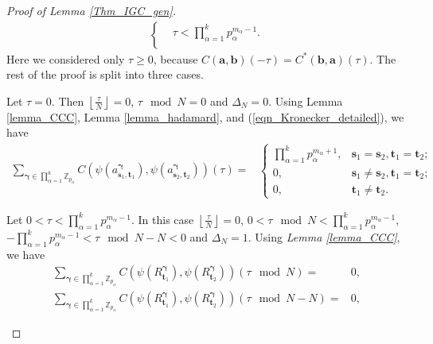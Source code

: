 \documentclass[pdflatex,sn-mathphys-num]{sn-jnl}%
\theoremstyle{thmstyleone}
\newcommand{\floor}[1]{\left\lfloor #1 \right\rfloor}
\begin{document}
\begin{proof}[Proof of Lemma \ref{Thm_IGC_gen}]
\begin{equation}
\begin{split}
\begin{cases}
					& \tau < \prod_{\alpha=1}^{k} p_\alpha^{m_\alpha-1}.\\
				\end{cases}
			\end{split}
		\end{equation}
		Here we considered only $\tau \geq 0$, because $C(\mathbf{a}, \mathbf{b})(-\tau ) = C^*(\mathbf{b}, \mathbf{a})(\tau )$.
		The rest of the proof is split into three cases.
		\begin{mycases}
			\item Let $\tau = 0$. Then $\floor{\frac{\tau}{N}}=0$, $\tau \mod N = 0$ and $\Delta_N=0$. Using Lemma \ref{lemma_CCC}, Lemma \ref{lemma_hadamard}, and (\ref{eqn_Kronecker_detailed}), we have
			\begin{equation}\label{Thm_2_case_1_eqn_1}
				\begin{split}
					\sum_{\bm{\gamma} \in \prod_{\alpha=1}^{k} \mathbb{Z}_{p_\alpha}}^{} C\left( \psi(a_{\mathbf{s}_1,\mathbf{t}_1}^{\bm{\gamma}} ), \psi(a_{\mathbf{s}_2,\mathbf{t}_2}^{\bm{\gamma}} ) \right) (\tau)
					=&
					\begin{cases}
						\prod_{\alpha=1}^{k} p_\alpha^{m_\alpha+1}, & \mathbf{s}_1= \mathbf{s}_2, \mathbf{t}_1 =\mathbf{t}_2;\\
						0, & \mathbf{s}_1 \neq \mathbf{s}_2, \mathbf{t}_1 =\mathbf{t}_2;\\
						0, & \mathbf{t}_1 \neq \mathbf{t}_2.
					\end{cases}
				\end{split}
			\end{equation}
			\item Let $0 < \tau < \prod_{\alpha=1}^{k} p_\alpha^{m_\alpha-1}$. In this case $\floor{\frac{\tau}{N}}=0$, $0 < \tau \mod N  < \prod_{\alpha=1}^{k} p_\alpha^{m_\alpha-1}$, $-\prod_{\alpha=1}^{k} p_\alpha^{m_\alpha-1}< \tau \mod N-N <0 $ and $\Delta_N=1$.
			Using \textit{Lemma \ref{lemma_CCC}}, we have
			\begin{equation}\label{Thm_2_case_2_eqn_1}
				\begin{split}
					\sum_{\bm{\gamma} \in \prod_{\alpha=1}^{k} \mathbb{Z}_{p_\alpha}}^{} C \left( \psi (R_{\mathbf{t}_1}^{\bm{\gamma}} ), \psi (R_{\mathbf{t}_2}^{\bm{\gamma}} ) \right) \left(\tau \mod N \right)= &0,\\
					\sum_{\bm{\gamma} \in \prod_{\alpha=1}^{k} \mathbb{Z}_{p_\alpha}}^{} C \left( \psi (R_{\mathbf{t}_1}^{\bm{\gamma}} ), \psi (R_{\mathbf{t}_2}^{\bm{\gamma}} ) \right) \left(\tau \mod N-N \right)= &0,

\end{split}
\end{equation}
\end{mycases}
\end{proof}
\end{document}
